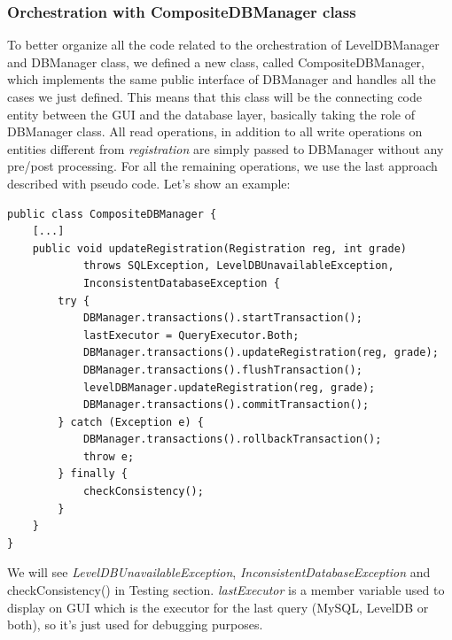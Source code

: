 \documentclass{report}
\begin{document}
\subsubsection*{Orchestration with CompositeDBManager class}
To better organize all the code related to the orchestration of LevelDBManager and DBManager class, we defined a new class, called CompositeDBManager, which implements the same public interface of DBManager and handles all the cases we just defined. This means that this class will be the connecting code entity between the GUI and the database layer, basically taking the role of DBManager class. All read operations, in addition to all write operations on entities different from \textit{registration} are simply passed to DBManager without any pre/post processing. For all the remaining operations, we use the last approach described with pseudo code. Let's show an example:
\begin{lstlisting}
public class CompositeDBManager {
	[...]
	public void updateRegistration(Registration reg, int grade)
			throws SQLException, LevelDBUnavailableException,
			InconsistentDatabaseException {
		try {
			DBManager.transactions().startTransaction();
			lastExecutor = QueryExecutor.Both;
			DBManager.transactions().updateRegistration(reg, grade);
			DBManager.transactions().flushTransaction();
			levelDBManager.updateRegistration(reg, grade);
			DBManager.transactions().commitTransaction();
		} catch (Exception e) {
			DBManager.transactions().rollbackTransaction();
			throw e;
		} finally {
			checkConsistency();
		}
	}
}
\end{lstlisting}
We will see \textit{LevelDBUnavailableException}, \textit{InconsistentDatabaseException} and checkConsistency() in Testing section. \textit{lastExecutor} is a member variable used to display on GUI which is the executor for the last query (MySQL, LevelDB or both), so it's just used for debugging purposes.

\newpage
{}
\end{document}
